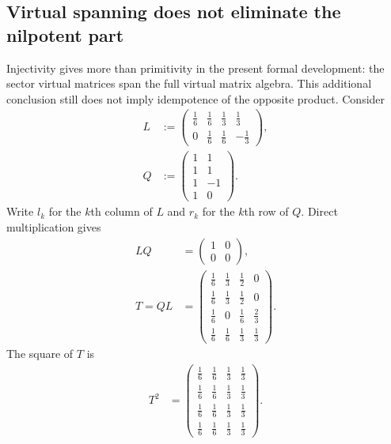 \documentclass{article}
\begin{document}
\subsection{Virtual spanning does not eliminate the nilpotent part}
\label{sec:cpgsv17_virtual_spanning}

Injectivity gives more than primitivity in the present formal development: the
sector virtual matrices span the full virtual matrix algebra. This additional
conclusion still does not imply idempotence of the opposite product. Consider
\begin{align}
    L
        &:=
        \begin{pmatrix}
            \tfrac16&\tfrac16&\tfrac13&\tfrac13\\
            0&\tfrac16&\tfrac16&-\tfrac13
        \end{pmatrix},
    \label{eq:cpgsv17_spanning_left_matrix}\\
    Q
        &:=
        \begin{pmatrix}
            1&1\\
            1&1\\
            1&-1\\
            1&0
        \end{pmatrix}.
    \label{eq:cpgsv17_spanning_right_matrix}
\end{align}
Write $l_k$ for the $k$th column of $L$ and $r_k$ for the $k$th row of $Q$.
Direct multiplication gives
\begin{align}
    LQ
        &=
        \begin{pmatrix}
            1&0\\
            0&0
        \end{pmatrix},
    \label{eq:cpgsv17_spanning_physical_projection}\\
    T=QL
        &=
        \begin{pmatrix}
            \tfrac16&\tfrac13&\tfrac12&0\\
            \tfrac16&\tfrac13&\tfrac12&0\\
            \tfrac16&0&\tfrac16&\tfrac23\\
            \tfrac16&\tfrac16&\tfrac13&\tfrac13
        \end{pmatrix}.
    \label{eq:cpgsv17_spanning_trace_matrix}
\end{align}
The square of $T$ is
\begin{align}
    T^2
        &=
        \begin{pmatrix}
            \tfrac16&\tfrac16&\tfrac13&\tfrac13\\
            \tfrac16&\tfrac16&\tfrac13&\tfrac13\\
            \tfrac16&\tfrac16&\tfrac13&\tfrac13\\
            \tfrac16&\tfrac16&\tfrac13&\tfrac13
        \end{pmatrix}.
    \label{eq:cpgsv17_spanning_trace_matrix_square}
\end{align}
\end{document}
